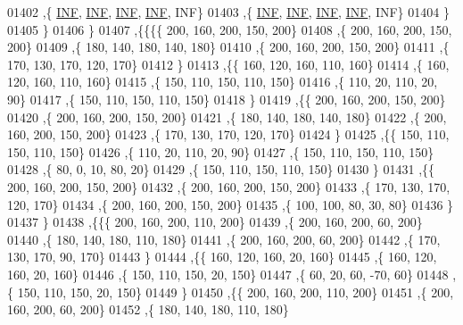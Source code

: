 \begin{DoxyCode}
01402     ,\{   \hyperlink{constants_8h_a12c2040f25d8e3a7b9e1c2024c618cb6}{INF},   \hyperlink{constants_8h_a12c2040f25d8e3a7b9e1c2024c618cb6}{INF},   \hyperlink{constants_8h_a12c2040f25d8e3a7b9e1c2024c618cb6}{INF},   \hyperlink{constants_8h_a12c2040f25d8e3a7b9e1c2024c618cb6}{INF},   INF\}
01403     ,\{   \hyperlink{constants_8h_a12c2040f25d8e3a7b9e1c2024c618cb6}{INF},   \hyperlink{constants_8h_a12c2040f25d8e3a7b9e1c2024c618cb6}{INF},   \hyperlink{constants_8h_a12c2040f25d8e3a7b9e1c2024c618cb6}{INF},   \hyperlink{constants_8h_a12c2040f25d8e3a7b9e1c2024c618cb6}{INF},   INF\}
01404     \}
01405    \}
01406   \}
01407  ,\{\{\{\{   200,   160,   200,   150,   200\}
01408     ,\{   200,   160,   200,   150,   200\}
01409     ,\{   180,   140,   180,   140,   180\}
01410     ,\{   200,   160,   200,   150,   200\}
01411     ,\{   170,   130,   170,   120,   170\}
01412     \}
01413    ,\{\{   160,   120,   160,   110,   160\}
01414     ,\{   160,   120,   160,   110,   160\}
01415     ,\{   150,   110,   150,   110,   150\}
01416     ,\{   110,    20,   110,    20,    90\}
01417     ,\{   150,   110,   150,   110,   150\}
01418     \}
01419    ,\{\{   200,   160,   200,   150,   200\}
01420     ,\{   200,   160,   200,   150,   200\}
01421     ,\{   180,   140,   180,   140,   180\}
01422     ,\{   200,   160,   200,   150,   200\}
01423     ,\{   170,   130,   170,   120,   170\}
01424     \}
01425    ,\{\{   150,   110,   150,   110,   150\}
01426     ,\{   110,    20,   110,    20,    90\}
01427     ,\{   150,   110,   150,   110,   150\}
01428     ,\{    80,     0,    10,    80,    20\}
01429     ,\{   150,   110,   150,   110,   150\}
01430     \}
01431    ,\{\{   200,   160,   200,   150,   200\}
01432     ,\{   200,   160,   200,   150,   200\}
01433     ,\{   170,   130,   170,   120,   170\}
01434     ,\{   200,   160,   200,   150,   200\}
01435     ,\{   100,   100,    80,    30,    80\}
01436     \}
01437    \}
01438   ,\{\{\{   200,   160,   200,   110,   200\}
01439     ,\{   200,   160,   200,    60,   200\}
01440     ,\{   180,   140,   180,   110,   180\}
01441     ,\{   200,   160,   200,    60,   200\}
01442     ,\{   170,   130,   170,    90,   170\}
01443     \}
01444    ,\{\{   160,   120,   160,    20,   160\}
01445     ,\{   160,   120,   160,    20,   160\}
01446     ,\{   150,   110,   150,    20,   150\}
01447     ,\{    60,    20,    60,   -70,    60\}
01448     ,\{   150,   110,   150,    20,   150\}
01449     \}
01450    ,\{\{   200,   160,   200,   110,   200\}
01451     ,\{   200,   160,   200,    60,   200\}
01452     ,\{   180,   140,   180,   110,   180\}

\end{DoxyCode}
